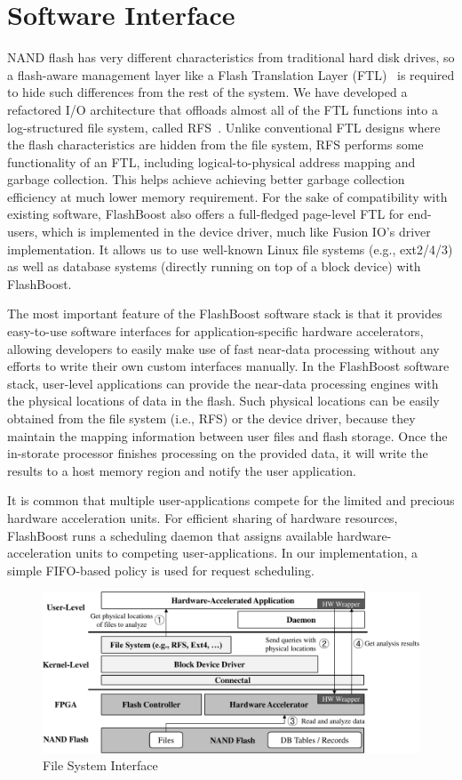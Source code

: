 \section{Software Interface}
\label{sec:software}

NAND flash has very different characteristics from traditional hard disk drives,
so a flash-aware management layer like a Flash Translation Layer (FTL)~\cite{}
is required to hide such differences from the rest of the system.
We have developed a refactored I/O architecture that offloads
almost all of the FTL functions into a log-structured file system, called
RFS~\cite{}. Unlike conventional FTL designs where the flash characteristics are
hidden from the file system, RFS performs some functionality of an FTL,
including logical-to-physical address mapping and garbage collection.
This helps achieve achieving better garbage collection
efficiency at much lower memory requirement. For the sake of compatibility with
existing software, FlashBoost also offers a full-fledged page-level FTL for
end-users, which is implemented in the device driver, much like Fusion IO’s
driver implementation. It
allows us to use well-known Linux file systems (e.g., ext2/4/3) as well as
database systems (directly running on top of a block device) with FlashBoost.

The most important feature of the FlashBoost software stack is that it provides
easy-to-use software interfaces for application-specific hardware accelerators, allowing
developers to easily make use of fast near-data processing without any efforts to
write their own custom interfaces manually. In the FlashBoost software stack, user-level
applications can provide the near-data processing engines with the physical
locations of data in the flash. 
Such physical locations can be easily obtained from the file
system (i.e., RFS) or the device driver, because they maintain the mapping
information between user files and flash storage. Once the in-storate processor
finishes processing on the provided data, it will write the results to a host
memory region and notify the user application.
 
It is common that multiple
user-applications compete for the limited and precious hardware acceleration
units. For efficient sharing of hardware resources, FlashBoost runs a scheduling
daemon that assigns available hardware-acceleration units to competing
user-applications. In our implementation, a simple FIFO-based policy is used for
request scheduling.

\begin{figure}[h]
	\begin{center}
	\includegraphics[width=0.4\paperwidth]{figures/software.pdf}
	\caption{File System Interface}
	\label{fig:filesystem}
	\end{center}
\end{figure}
